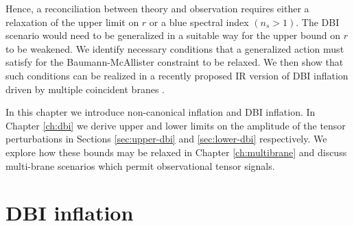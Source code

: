 Hence, a reconciliation between theory and observation 
requires either a relaxation of the upper limit on $r$ or a blue 
spectral index $(n_s >1)$. The DBI scenario would need 
to be generalized in a suitable way for the upper bound on $r$
to be weakened. We identify necessary conditions that a 
generalized action must satisfy for the Baumann-McAllister
 constraint to be relaxed. 
We then show that such conditions can be realized in a recently 
proposed IR version of DBI inflation driven
by multiple coincident branes \cite{thomasward}. 


In this chapter we introduce non-canonical inflation and DBI inflation.
In Chapter \ref{ch:dbi} we derive upper and lower 
limits on the amplitude of the tensor perturbations in Sections \ref{sec:upper-dbi} and  
\ref{sec:lower-dbi} respectively.  
We explore how these bounds may be relaxed in Chapter \ref{ch:multibrane} and discuss multi-brane 
scenarios which permit observational tensor signals. 
% 
% 
% 
% 
\section{DBI inflation} 
% 
\label{sec:dbiinflation}

